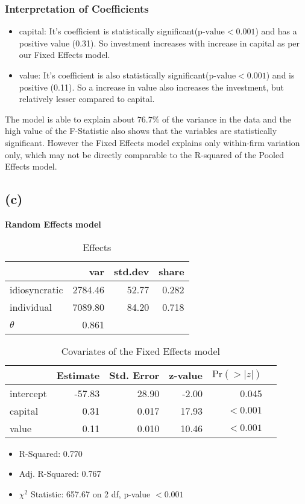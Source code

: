 \documentclass[a4paper]{article}
\begin{document}
\subsubsection*{\textbf{Interpretation of Coefficients}}
\begin{itemize}
    \item capital:  It's coefficient is statistically significant(\(\text{p-value}<0.001\)) and has a positive value (0.31). So investment increases with increase in capital as per our Fixed Effects model.
    \item value: It's coefficient is also statistically significant(\(\text{p-value}<0.001\)) and is positive (0.11). So a increase in value also increases the investment, but relatively lesser compared to capital. 
\end{itemize}

The model is able to explain about \(76.7\%\) of the variance in the data and the high value of the F-Statistic also shows that the variables are statistically significant. However the Fixed Effects model explains only within-firm variation only, which may not be directly comparable to the R-squared of the Pooled Effects model.

\newpage
\subsection*{(c)}
\textbf{Random Effects model}
\begin{table}[ht]
    \centering
    \begin{tabular}{lrrr}
        \toprule
            & var & std.dev & share \\
            \midrule
    idiosyncratic & 2784.46 & 52.77 & 0.282 \\
    individual    & 7089.80 & 84.20 & 0.718 \\
    \midrule
    \(\theta\) &0.861\\
    \bottomrule        
    \end{tabular}    
    \caption{Effects}
\end{table}
\begin{table}[ht]
    \centering
    \begin{tabular}{@{}lrrrrr@{}}
        \toprule
                & Estimate  & Std. Error  & z-value & \(\text{Pr}(>|z|)\)\\
                \midrule
        intercept & -57.83 & 28.90 & -2.00 & 0.045 \\
        capital   & 0.31   & 0.017 & 17.93  & \(<0.001\)\\
        value     & 0.11   & 0.010 & 10.46 & \(<0.001\)\\
        \bottomrule
    \end{tabular}
    \caption{Covariates of the Fixed Effects model}
\end{table}
\begin{itemize}
    \item R-Squared: 0.770
    \item Adj. R-Squared: 0.767
    \item \(\chi^2\) Statistic: 657.67 on 2 df, p-value \(<0.001\) 
\end{itemize}
\end{document}
